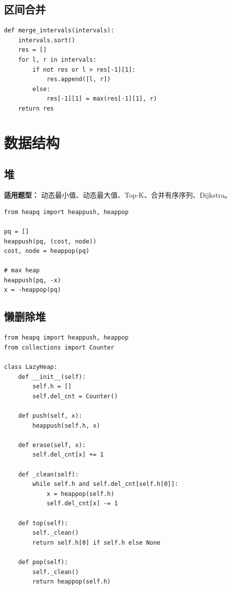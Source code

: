 \documentclass[UTF8,a4paper,14pt]{ctexart}
\begin{document}
\subsection{区间合并}

\begin{lstlisting}
def merge_intervals(intervals):
    intervals.sort()
    res = []
    for l, r in intervals:
        if not res or l > res[-1][1]:
            res.append([l, r])
        else:
            res[-1][1] = max(res[-1][1], r)
    return res
\end{lstlisting}

\section{数据结构}

\subsection{堆}

\textbf{适用题型：}
动态最小值、动态最大值、Top-K、合并有序序列、Dijkstra。

\begin{lstlisting}
from heapq import heappush, heappop

pq = []
heappush(pq, (cost, node))
cost, node = heappop(pq)

# max heap
heappush(pq, -x)
x = -heappop(pq)
\end{lstlisting}

\subsection{懒删除堆}

\begin{lstlisting}
from heapq import heappush, heappop
from collections import Counter

class LazyHeap:
    def __init__(self):
        self.h = []
        self.del_cnt = Counter()

    def push(self, x):
        heappush(self.h, x)

    def erase(self, x):
        self.del_cnt[x] += 1

    def _clean(self):
        while self.h and self.del_cnt[self.h[0]]:
            x = heappop(self.h)
            self.del_cnt[x] -= 1

    def top(self):
        self._clean()
        return self.h[0] if self.h else None

    def pop(self):
        self._clean()
        return heappop(self.h)
\end{lstlisting}
\end{document}
